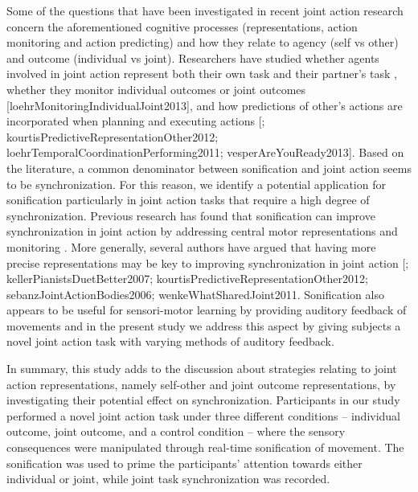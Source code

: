 \documentclass[10pt,a4paper,onecolumn]{article}
\begin{document}
Some of the questions that have been investigated in recent joint action research concern the aforementioned cognitive processes (representations, action monitoring and action predicting) and how they relate to agency (self vs other) and outcome (individual vs joint). Researchers have studied whether agents involved in joint action represent both their own task and their partner's task \autocite{loehrSoundYouMe2016}, whether they monitor individual outcomes or joint outcomes {[}loehrMonitoringIndividualJoint2013{]}, and how predictions of other's actions are incorporated when planning and executing actions {[}\textcite{knoblichActionCoordinationGroups2003}; kourtisPredictiveRepresentationOther2012; loehrTemporalCoordinationPerforming2011; vesperAreYouReady2013{]}. Based on the literature, a common denominator between sonification and joint action seems to be synchronization. For this reason, we identify a potential application for sonification particularly in joint action tasks that require a high degree of synchronization. Previous research has found that sonification can improve synchronization in joint action by addressing central motor representations \autocite{schmitzPerceptualEffectsAuditory2012} and monitoring \autocite{vesperMinimalArchitectureJoint2010}. More generally, several authors have argued that having more precise representations may be key to improving synchronization in joint action {[}\textcite{boltSensoryAttenuationAuditory2021}; kellerPianistsDuetBetter2007; kourtisPredictiveRepresentationOther2012; sebanzJointActionBodies2006; wenkeWhatSharedJoint2011. Sonification also appears to be useful for sensori-motor learning by providing auditory feedback of movements \autocite{bevilacquaSensoriMotorLearningMovement2016} and in the present study we address this aspect by giving subjects a novel joint action task with varying methods of auditory feedback.

In summary, this study adds to the discussion about strategies relating to joint action representations, namely self-other and joint outcome representations, by investigating their potential effect on synchronization. Participants in our study performed a novel joint action task under three different conditions -- individual outcome, joint outcome, and a control condition -- where the sensory consequences were manipulated through real-time sonification of movement. The sonification was used to prime the participants' attention towards either individual or joint, while joint task synchronization was recorded.
\end{document}
